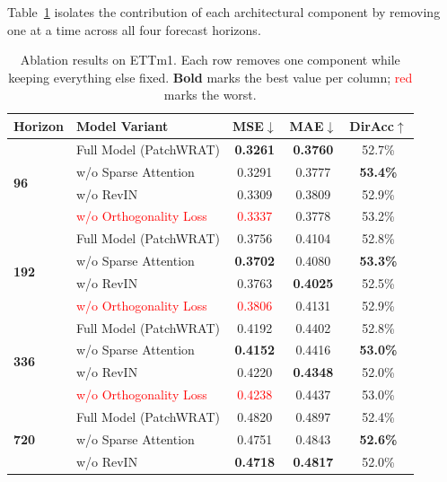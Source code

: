 \documentclass[11pt, letterpaper]{article}
\begin{document}
Table~\ref{tab:ablation} isolates the contribution of each architectural component by removing
one at a time across all four forecast horizons.

\begin{table}[H]
\centering
\caption{Ablation results on ETTm1. Each row removes one component while keeping everything
         else fixed. \textbf{Bold} marks the best value per column; \textcolor{red}{red}
         marks the worst.}
\label{tab:ablation}
\renewcommand{\arraystretch}{1.35}
\sffamily
\begin{tabular}{@{}llccc@{}}
\toprule
\textbf{Horizon} & \textbf{Model Variant} & \textbf{MSE}$\downarrow$ &
  \textbf{MAE}$\downarrow$ & \textbf{DirAcc}$\uparrow$ \\
\midrule
\multirow{4}{*}{\textbf{96}}
  & Full Model (PatchWRAT)    & \textbf{0.3261} & \textbf{0.3760} & 52.7\% \\
  & w/o Sparse Attention      & 0.3291 & 0.3777 & \textbf{53.4\%} \\
  & w/o RevIN                 & 0.3309 & 0.3809 & 52.9\% \\
  & \textcolor{red}{w/o Orthogonality Loss} & \textcolor{red}{0.3337} & 0.3778 & 53.2\% \\
\midrule
\multirow{4}{*}{\textbf{192}}
  & Full Model (PatchWRAT)    & 0.3756 & 0.4104 & 52.8\% \\
  & w/o Sparse Attention      & \textbf{0.3702} & 0.4080 & \textbf{53.3\%} \\
  & w/o RevIN                 & 0.3763 & \textbf{0.4025} & 52.5\% \\
  & \textcolor{red}{w/o Orthogonality Loss} & \textcolor{red}{0.3806} & 0.4131 & 52.9\% \\
\midrule
\multirow{4}{*}{\textbf{336}}
  & Full Model (PatchWRAT)    & 0.4192 & 0.4402 & 52.8\% \\
  & w/o Sparse Attention      & \textbf{0.4152} & 0.4416 & \textbf{53.0\%} \\
  & w/o RevIN                 & 0.4220 & \textbf{0.4348} & 52.0\% \\
  & \textcolor{red}{w/o Orthogonality Loss} & \textcolor{red}{0.4238} & 0.4437 & 53.0\% \\
\midrule
\multirow{4}{*}{\textbf{720}}
  & Full Model (PatchWRAT)    & 0.4820 & 0.4897 & 52.4\% \\
  & w/o Sparse Attention      & 0.4751 & 0.4843 & \textbf{52.6\%} \\
  & w/o RevIN                 & \textbf{0.4718} & \textbf{0.4817} & 52.0\% \\

\end{tabular}
\end{table}
\end{document}
